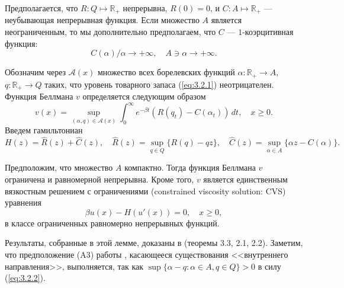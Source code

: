Предполагается, что $R:Q\mapsto\mathbb R_+$ непрерывна, $R(0)=0$, и $C:A\mapsto\mathbb R_+$ --- неубывающая непрерывная функция. Если множество $A$ является неограниченным, то мы дополнительно предполагаем, что $C$ --- $1$-коэрцитивная функция:
\begin{equation} \label{eq:3.2.3}
C(\alpha)/\alpha\to +\infty,\quad A\ni\alpha\to+\infty.
\end{equation}

Обозначим через $\mathscr A(x)$ множество всех борелевских функций $\alpha:\mathbb R_+\to A$, $q:\mathbb R_+\to Q$ таких, что уровень товарного запаса (\ref{eq:3.2.1}) неотрицателен. Функция Беллмана $v$ определяется следующим образом
\begin{equation} \label{eq:3.2.4}
v(x)=\sup_{(\alpha,q)\in\mathscr A(x)}\int_0^\infty e^{-\beta t} (R(q_t)-C(\alpha_t))\,dt, \quad x\ge 0.
\end{equation}
Введем гамильтониан
\begin{equation} \label{eq:3.2.5}
H(z)=\widehat R(z)+\widehat C(z),\quad \widehat R(z)=\sup_{q\in Q}\{R(q)-qz\},\quad
\widehat C(z)=\sup_{\alpha\in A}\{\alpha z-C(\alpha)\}.
\end{equation}
\begin{lemma} \label{lem:3.1}
Предположим, что множество $A$ компактно. Тогда функция Беллмана $v$ ограничена и равномерной непрерывна. Кроме того, $v$ является единственным вязкостным решением с ограничениями (constrained viscosity solution: CVS) уравнения 
\begin{equation} \label{eq:3.2.6}
\beta u(x)-H(u'(x))=0,\quad x\ge 0,
\end{equation}
в классе ограниченных равномерно непрерывных функций.
\end{lemma}
Результаты, собранные в этой лемме, доказаны в \cite{Son86} (теоремы 3.3, 2.1, 2.2).
Заметим, что предположение (A3) работы \cite{Son86}, касающееся существования <<внутреннего направления>>, выполняется, так как $\sup\{\alpha-q:\alpha\in A, q\in Q\}>0$ в силу (\ref{eq:3.2.2}).

